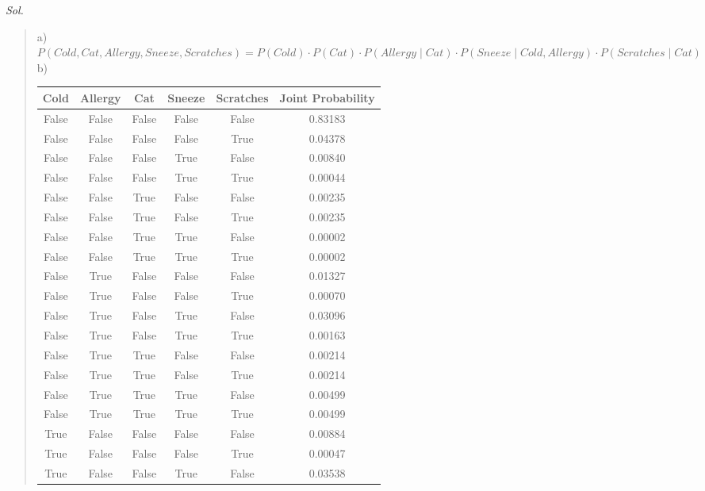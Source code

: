 \documentclass{article}
\theoremstyle{definition}
\newcommand{\<}{\langle}
\renewcommand{\>}{\rangle}
\begin{document}
\begin{enumerate}[label=\textbf{\Alph*}]
      \vspace{1em} 
      \textit{ Sol. }
      \begin{quote}
        a) $P(Cold, Cat, Allergy, Sneeze, Scratches) = P(Cold) \cdot P(Cat) \cdot P(Allergy \mid Cat) \cdot P(Sneeze \mid Cold, Allergy) \cdot P(Scratches \mid Cat)$ 
        \newpage
        b)
        \begin{table}[h ]
        \centering
        \begin{tabular}{|c|c|c|c|c|c|}
        \hline
        Cold & Allergy & Cat & Sneeze & Scratches & Joint Probability \\ \hline
        False & False & False & False & False & 0.83183 \\ \hline
        False & False & False & False & True & 0.04378 \\ \hline
        False & False & False & True & False & 0.00840 \\ \hline
        False & False & False & True & True & 0.00044 \\ \hline
        False & False & True & False & False & 0.00235 \\ \hline
        False & False & True & False & True & 0.00235 \\ \hline
        False & False & True & True & False & 0.00002 \\ \hline
        False & False & True & True & True & 0.00002 \\ \hline
        False & True & False & False & False & 0.01327 \\ \hline
        False & True & False & False & True & 0.00070 \\ \hline
        False & True & False & True & False & 0.03096 \\ \hline
        False & True & False & True & True & 0.00163 \\ \hline
        False & True & True & False & False & 0.00214 \\ \hline
        False & True & True & False & True & 0.00214 \\ \hline
        False & True & True & True & False & 0.00499 \\ \hline
        False & True & True & True & True & 0.00499 \\ \hline
        True & False & False & False & False & 0.00884 \\ \hline
        True & False & False & False & True & 0.00047 \\ \hline
        True & False & False & True & False & 0.03538 \\ \hline

\end{tabular}
\end{table}
\end{quote}
\end{enumerate}
\end{document}
